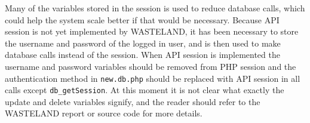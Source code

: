 Many of the variables stored in the session is used to reduce database calls, which could help the system scale better if that would be necessary. Because API session is not yet implemented by WASTELAND, it has been necessary to store the username and password of the logged in user, and is then used to make database calls instead of the session. When API session is implemented the username and password variables should be removed from PHP session and the authentication method in \texttt{new.db.php} should be replaced with API session in all calls except \texttt{db_getSession}. At this moment it is not clear what exactly the update and delete variables signify, and the reader should refer to the WASTELAND report or source code for more details.